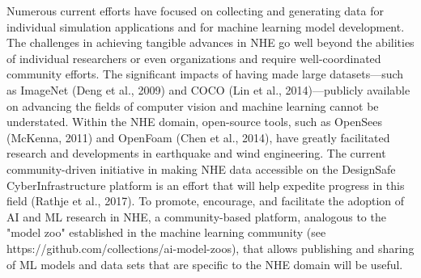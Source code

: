 Numerous current efforts have focused on collecting and generating data for individual simulation applications and for machine learning model development. The challenges in achieving tangible advances in NHE go well beyond the abilities of individual researchers or even organizations and require well-coordinated community efforts. The significant impacts of having made large datasets—such as ImageNet (Deng et al., 2009) and COCO (Lin et al., 2014)—publicly available on advancing the fields of computer vision and machine learning cannot be understated. Within the NHE domain, open-source tools, such as OpenSees (McKenna, 2011) and OpenFoam (Chen et al., 2014), have greatly facilitated research and developments in earthquake and wind engineering. The current community-driven initiative in making NHE data accessible on the DesignSafe CyberInfrastructure platform is an effort that will help expedite progress in this field (Rathje et al., 2017). To promote, encourage, and facilitate the adoption of AI and ML research in NHE, a community-based platform, analogous to the "model zoo" established in the machine learning community (see https://github.com/collections/ai-model-zoos), that allows publishing and sharing of ML models and data sets that are specific to the NHE domain will be useful. 

